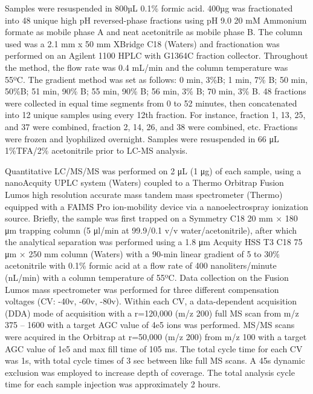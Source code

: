 Samples were resuspended in 800µL 0.1\% formic acid. 400µg was fractionated into
48 unique high pH reversed-phase fractions using pH 9.0 20 mM Ammonium formate
as mobile phase A and neat acetonitrile as mobile phase B. The column used was a
2.1 mm x 50 mm XBridge C18 (Waters) and fractionation was performed on an
Agilent 1100 HPLC with G1364C fraction collector. Throughout the method, the
flow rate was 0.4 mL/min and the column temperature was 55ºC. The gradient
method was set as follows: 0 min, 3\%B; 1 min, 7\% B; 50 min, 50\%B; 51 min,
90\% B; 55 min, 90\% B; 56 min, 3\% B; 70 min, 3\% B. 48 fractions were
collected in equal time segments from 0 to 52 minutes, then concatenated into 12
unique samples using every 12th fraction. For instance, fraction 1, 13, 25, and
37 were combined, fraction 2, 14, 26, and 38 were combined, etc. Fractions were
frozen and lyophilized overnight. Samples were resuspended in 66 μL 1\%TFA/2\%
acetonitrile prior to LC-MS analysis.

Quantitative LC/MS/MS was performed on 2 μL (1 μg) of each sample, using a
nanoAcquity UPLC system (Waters) coupled to a Thermo Orbitrap Fusion Lumos high
resolution accurate mass tandem mass spectrometer (Thermo) equipped with a FAIMS
Pro ion-mobility device via a nanoelectrospray ionization source. Briefly, the
sample was first trapped on a Symmetry C18 20 mm × 180 μm trapping column (5
μl/min at 99.9/0.1 v/v water/acetonitrile), after which the analytical
separation was performed using a 1.8 μm Acquity HSS T3 C18 75 μm × 250 mm column
(Waters) with a 90-min linear gradient of 5 to 30\% acetonitrile with 0.1\%
formic acid at a flow rate of 400 nanoliters/minute (nL/min) with a column
temperature of 55ºC. Data collection on the Fusion Lumos mass spectrometer was
performed for three different compensation voltages (CV: -40v, -60v, -80v).
Within each CV, a data-dependent acquisition (DDA) mode of acquisition with a
r=120,000 (\@ m/z 200) full MS scan from m/z 375 – 1600 with a target AGC value
of 4e5 ions was performed. MS/MS scans were acquired in the Orbitrap at r=50,000
(\@ m/z 200) from m/z 100 with a target AGC value of 1e5 and max fill time of 105
ms. The total cycle time for each CV was 1s, with total cycle times of 3 sec
between like full MS scans. A 45s dynamic exclusion was employed to increase
depth of coverage. The total analysis cycle time for each sample injection was
approximately 2 hours.

